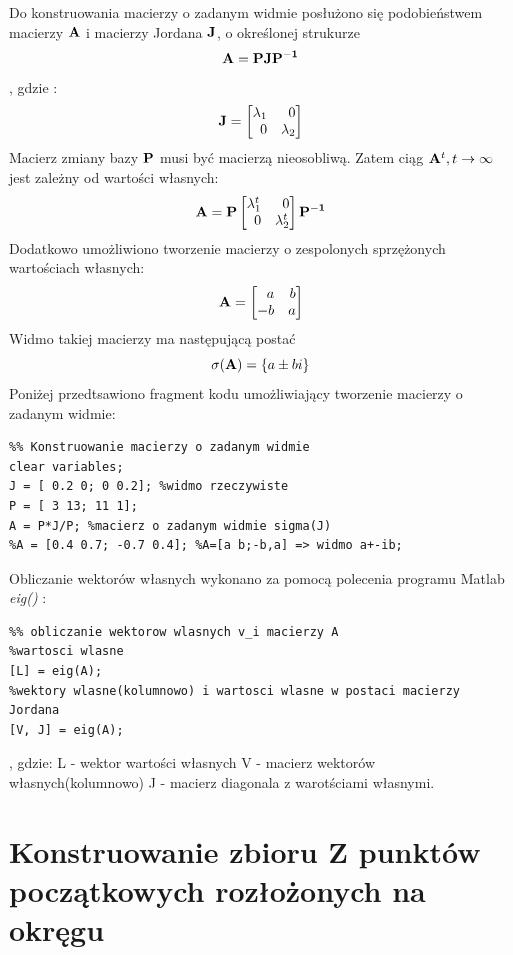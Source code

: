 \documentclass{article}
\begin{document}
Do konstruowania macierzy o zadanym widmie posłużono się podobieństwem macierzy $\bold{A}$ i macierzy Jordana $\bold{J}$, o okre\'slonej strukurze
\[
\bold{A} = \bold{PJP^{-1}}
\]
, gdzie :
 \[
\bold{J}=\begin{bmatrix*}[r]
  \lambda_1 & 0\\
  0 & \lambda_2 
  \end{bmatrix*}
\]
Macierz zmiany bazy $\bold{P}$ musi być macierzą nieosobliwą. \newline
Zatem ciąg $\bold{A}^t, t \to \infty$ jest zależny od warto\'sci własnych:
\[
\bold{A} = \bold{P
\begin{bmatrix*}[r]
  \lambda_1^t & 0\\
  0 & \lambda_2^t 
  \end{bmatrix*}
  P^{-1}}
\]
Dodatkowo umożliwiono tworzenie macierzy o zespolonych sprzężonych warto\'sciach własnych:
 \[
\bold{A}=\begin{bmatrix*}[r]
  a & b\\
  -b & a 
  \end{bmatrix*}
\]
Widmo takiej macierzy ma następującą postać
\[
\sigma(\bold{A})=\{a \pm bi\}
\]
Poniżej przedtsawiono fragment kodu umożliwiający tworzenie macierzy o zadanym widmie:
\begin{verbatim}
%% Konstruowanie macierzy o zadanym widmie
clear variables;
J = [ 0.2 0; 0 0.2]; %widmo rzeczywiste
P = [ 3 13; 11 1];
A = P*J/P; %macierz o zadanym widmie sigma(J)
%A = [0.4 0.7; -0.7 0.4]; %A=[a b;-b,a] => widmo a+-ib;
\end{verbatim}
Obliczanie wektorów własnych wykonano za pomocą polecenia programu Matlab \textit{eig()} :
\begin{verbatim}
%% obliczanie wektorow wlasnych v_i macierzy A
%wartosci wlasne
[L] = eig(A);
%wektory wlasne(kolumnowo) i wartosci wlasne w postaci macierzy Jordana
[V, J] = eig(A);
\end{verbatim}
, gdzie: \newline
L - wektor warto\'sci własnych \newline
V - macierz wektorów własnych(kolumnowo) \newline
J - macierz diagonala z warot\'sciami własnymi.


\section{Konstruowanie zbioru Z punktów początkowych rozłożonych na okręgu}
\end{document}
